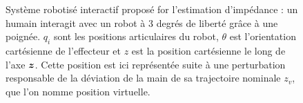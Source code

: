\begin{figure}[!htb]
		\caption{Système robotisé interactif proposé for l'estimation d'impédance : un humain interagit avec un robot à 3 degrés de liberté grâce à une poignée. $ q_i $  sont les positions articulaires du robot, $ \theta $ est l'orientation cartésienne de l'effecteur et $ z $ est la position cartésienne le long de l'axe $ \vect{z} $. Cette position est ici représentée suite à une perturbation responsable de la déviation de la main de sa trajectoire nominale $ z_v $, que l'on nomme position virtuelle.}
		\label{fig_exp_bench}
	\end{figure}
